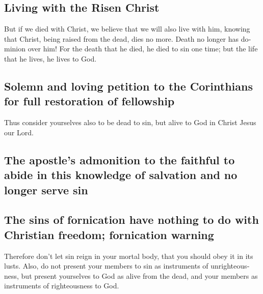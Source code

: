 \begin{paracol}{2}
\begin{otherlanguage}{english}
\hypertarget{living-with-the-risen-christ}{%
\subsection{Living with the Risen
Christ}\label{living-with-the-risen-christ}}

 But if we died with Christ, we believe that we will also
live with him,  knowing that Christ, being raised from the
dead, dies no more. Death no longer has dominion over him!
 For the death that he died, he died to sin one time; but
the life that he lives, he lives to God.

\hypertarget{solemn-and-loving-petition-to-the-corinthians-for-full-restoration-of-fellowship}{%
\subsection{Solemn and loving petition to the Corinthians for full
restoration of
fellowship}\label{solemn-and-loving-petition-to-the-corinthians-for-full-restoration-of-fellowship}}

 Thus consider yourselves also to be dead to sin, but
alive to God in Christ Jesus our Lord.

\hypertarget{the-apostles-admonition-to-the-faithful-to-abide-in-this-knowledge-of-salvation-and-no-longer-serve-sin}{%
\subsection{The apostle's admonition to the faithful to abide in this
knowledge of salvation and no longer serve
sin}\label{the-apostles-admonition-to-the-faithful-to-abide-in-this-knowledge-of-salvation-and-no-longer-serve-sin}}

\hypertarget{the-sins-of-fornication-have-nothing-to-do-with-christian-freedom-fornication-warning}{%
\subsection{The sins of fornication have nothing to do with Christian
freedom; fornication
warning}\label{the-sins-of-fornication-have-nothing-to-do-with-christian-freedom-fornication-warning}}

 Therefore don't let sin reign in your mortal body, that
you should obey it in its lusts.  Also, do not present
your members to sin as instruments of unrighteousness, but present
yourselves to God as alive from the dead, and your members as
instruments of righteousness to God.


\end{otherlanguage}
\end{paracol}
